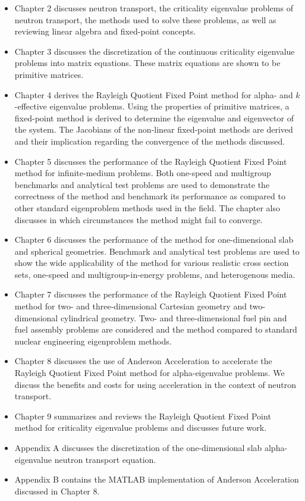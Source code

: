 \begin{itemize}
	\item Chapter 2 discusses neutron transport, the criticality eigenvalue problems of neutron transport, the methods used to solve these problems, as well as reviewing linear algebra and fixed-point concepts.
	\item Chapter 3 discusses the discretization of the continuous criticality eigenvalue problems into matrix equations. These matrix equations are shown to be primitive matrices.
	\item Chapter 4 derives the Rayleigh Quotient Fixed Point method for alpha- and $k$-effective eigenvalue problems. Using the properties of primitive matrices, a fixed-point method is derived to determine the eigenvalue and eigenvector of the system. The Jacobians of the non-linear fixed-point methods are derived and their implication regarding the convergence of the methods discussed.
	\item Chapter 5 discusses the performance of the Rayleigh Quotient Fixed Point method for infinite-medium problems. Both one-speed and multigroup benchmarks and analytical test problems are used to demonstrate the correctness of the method and benchmark its performance as compared to other standard eigenproblem methods used in the field. The chapter also discusses in which circumstances the method might fail to converge.
	\item Chapter 6 discusses the performance of the method for one-dimensional slab and spherical geometries. Benchmark and analytical test problems are used to show the wide applicability of the method for various realistic cross section sets, one-speed and multigroup-in-energy problems, and heterogenous media.
	\item Chapter 7 discusses the performance of the Rayleigh Quotient Fixed Point method for two- and three-dimensional Cartesian geometry and two-dimensional cylindrical geometry. Two- and three-dimensional fuel pin and fuel assembly problems are considered and the method compared to standard nuclear engineering eigenproblem methods.
	\item Chapter 8 discusses the use of Anderson Acceleration to accelerate the Rayleigh Quotient Fixed Point method for alpha-eigenvalue problems. We discuss the benefits and costs for using acceleration in the context of neutron transport.
	\item Chapter 9 summarizes and reviews the Rayleigh Quotient Fixed Point method for criticality eigenvalue problems and discusses future work.
	\item Appendix A discusses the discretization of the one-dimensional slab alpha-eigenvalue neutron transport equation.
	\item Appendix B contains the MATLAB implementation of Anderson Acceleration discussed in Chapter 8.
\end{itemize}

